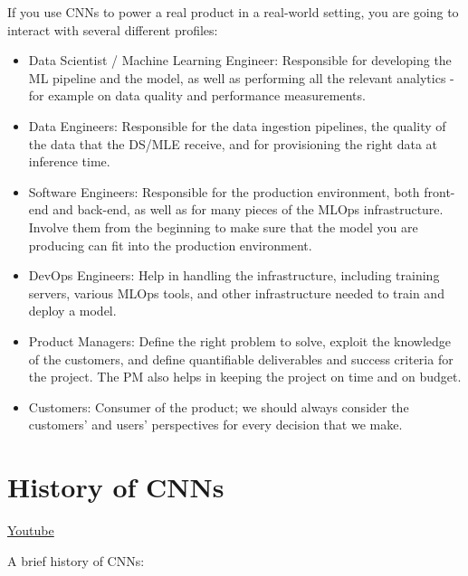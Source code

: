If you use CNNs to power a real product in a real-world setting, you are going to interact with several different profiles:

\begin{itemize}
    \item Data Scientist / Machine Learning Engineer: Responsible for developing the ML pipeline and the model, as well as performing all the relevant analytics - for example on data quality and performance measurements.
    \item Data Engineers: Responsible for the data ingestion pipelines, the quality of the data that the DS/MLE receive, and for provisioning the right data at inference time.
    \item Software Engineers: Responsible for the production environment, both front-end and back-end, as well as for many pieces of the MLOps infrastructure. Involve them from the beginning to make sure that the model you are producing can fit into the production environment.
    \item DevOps Engineers: Help in handling the infrastructure, including training servers, various MLOps tools, and other infrastructure needed to train and deploy a model.
    \item Product Managers: Define the right problem to solve, exploit the knowledge of the customers, and define quantifiable deliverables and success criteria for the project. The PM also helps in keeping the project on time and on budget.
    \item Customers: Consumer of the product; we should always consider the customers' and users' perspectives for every decision that we make.
\end{itemize}

\section{History of CNNs}
\href{https://www.youtube.com/watch?v=1J6SM_3FoY4&ab_channel=Udacity}{Youtube} \newline

A brief history of CNNs:


